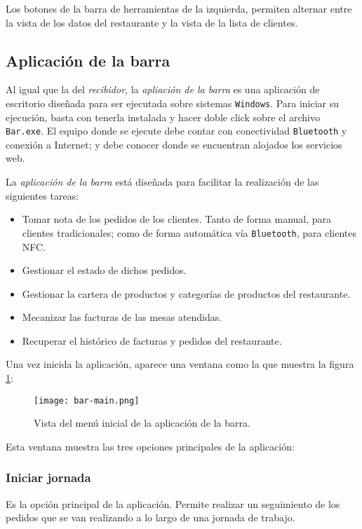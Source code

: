 Los botones de la barra de herramientas de la izquierda, permiten alternar
entre la vista de los datos del restaurante y la vista de la lista de clientes.


\subsection{Aplicación de la barra}
Al igual que la del \emph{recibidor}, la \emph{apliación de la barra} es una
aplicación de escritorio diseñada para ser ejecutada sobre sistemas
\texttt{Windows}. Para iniciar su ejecución, basta con tenerla instalada y
hacer doble click sobre el archivo \texttt{Bar.exe}. El equipo donde se
ejecute debe contar con conectividad \texttt{Bluetooth} y conexión a
Internet; y debe conocer donde se encuentran alojados los servicios web.

La \emph{aplicación de la barra} está diseñada para facilitar la realización de
las siguientes tareas:
\begin{itemize}
\item Tomar nota de los pedidos de los clientes. Tanto de forma manual, para
clientes tradicionales; como de forma automática vía \texttt{Bluetooth}, para
clientes \acs{NFC}.
\item Gestionar el estado de dichos pedidos.
\item Gestionar la cartera de productos y categorías de productos del
restaurante.
\item Mecanizar las facturas de las mesas atendidas.
\item Recuperar el histórico de facturas y pedidos del restaurante.
\end{itemize}

Una vez inicida la aplicación, aparece una ventana como la que muestra la
figura \ref{fig:bar-main}:

  \begin{figure}[H]
    \begin{center}
      \texttt{[image: bar-main.png]}
      \caption{Vista del menú inicial de la aplicación de la barra.}
      \label{fig:bar-main}
    \end{center}
  \end{figure}

Esta ventana muestra las tres opciones principales de la aplicación:

\subsubsection{Iniciar jornada}
Es la opción principal de la aplicación. Permite realizar un seguimiento de los
pedidos que se van realizando a lo largo de una jornada de trabajo.

